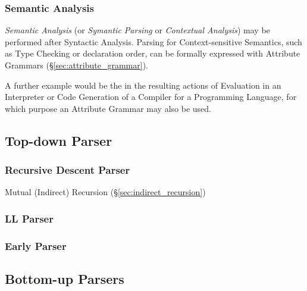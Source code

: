 \subsubsection{Semantic Analysis}\label{sec:semantic_analysis}

\emph{Semantic Analysis} (or \emph{Symantic Parsing} or
\emph{Contextual Analysis}) may be performed after Syntactic Analysis.
Parsing for Context-sensitive Semantics, such as Type Checking or
declaration order, can be formally expressed with Attribute Grammars
(\S\ref{sec:attribute_grammar}).

A further example would be the in the resulting actions of Evaluation
in an Interpreter or Code Generation of a Compiler for a Programming
Language, for which purpose an Attribute Grammar may also be used.



\subsection{Top-down Parser}\label{sec:topdown_parser}

\subsubsection{Recursive Descent Parser}\label{sec:recursive_descent}

Mutual (Indirect) Recursion (\S\ref{sec:indirect_recursion})



\subsubsection{LL Parser}\label{sec:ll_parser}

\subsubsection{Early Parser}\label{sec:early_parser}



\subsection{Bottom-up Parsers}\label{sec:bottomup_parser}


